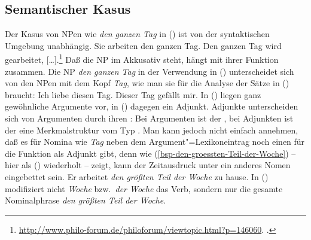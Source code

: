 \subsection{Semantischer Kasus}

%
Der Kasus von NPen wie \emph{den ganzen Tag} in () ist von der syntaktischen Umgebung unabhängig.
\eal
\ex Sie arbeiten den ganzen Tag.
\ex Den ganzen Tag wird gearbeitet, [\ldots].\footnote{
  \url{http://www.philo-forum.de/philoforum/viewtopic.html?p=146060}. .
}
\zl
Daß die NP im Akkusativ steht, hängt mit ihrer Funktion zusammen. Die NP \emph{den ganzen Tag} in
der Verwendung in () unterscheidet sich von den NPen mit dem Kopf \emph{Tag}, wie
man sie für die Analyse der Sätze in () braucht:
\eal
\ex Ich liebe diesen Tag.
\ex Dieser Tag gefällt mir.
\zl
In () liegen ganz gewöhnliche Argumente vor, in () dagegen ein Adjunkt. Adjunkte
unterscheiden sich von Argumenten durch ihren \modw: Bei Argumenten ist der \modw {},
bei Adjunkten ist der \modw eine Merkmalstruktur vom Typ . Man kann jedoch nicht
einfach annehmen, daß es für Nomina wie \emph{Tag} neben dem Argument"=Lexikoneintrag noch einen für
die Funktion als Adjunkt gibt, denn wie (\ref{bsp-den-groessten-Teil-der-Woche}) -- hier als
() wiederholt -- zeigt, kann der Zeitausdruck unter ein anderes Nomen eingebettet sein.
\ea
\label{bsp-den-groessten-Teil-der-Woche-zwei}
Er arbeitet \emph{den größten Teil der Woche} zu hause.
\z
In () modifiziert nicht \emph{Woche} bzw.\ \emph{der Woche} das Verb, sondern nur die gesamte
Nominalphrase \emph{den größten Teil der Woche}. 


